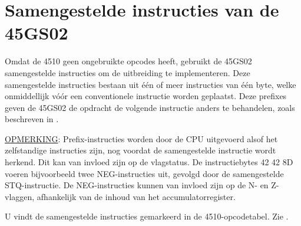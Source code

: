 

\section{Samengestelde instructies van de 45GS02}

Omdat de 4510 geen ongebruikte opcodes heeft, gebruikt de 45GS02 samengestelde instructies om de uitbreiding te implementeren. Deze samengestelde instructies bestaan uit één of meer instructies van één byte, welke onmiddellijk vóór een conventionele instructie worden geplaatst. Deze prefixes geven de 45GS02 de opdracht de volgende instructie anders te behandelen, zoals beschreven in .

\underline{OPMERKING}: Prefix-instructies worden door de CPU uitgevoerd alsof het zelfstandige instructies zijn, nog voordat de samengestelde instructie wordt herkend. Dit kan van invloed zijn op de vlagstatus. De instructiebytes 42 42 8D voeren bijvoorbeeld twee NEG-instructies uit, gevolgd door de samengestelde STQ-instructie. De NEG-instructies kunnen van invloed zijn op de N- en Z-vlaggen, afhankelijk van de inhoud van het accumulatorregister.

U vindt de samengestelde instructies gemarkeerd in de 4510-opcodetabel. Zie .






\endgroup
